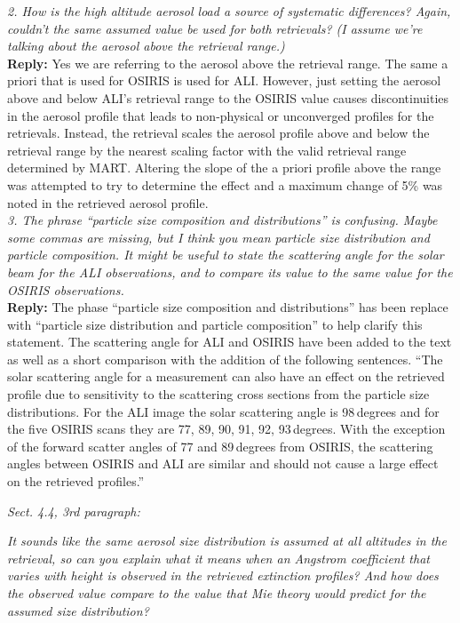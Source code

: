 \documentclass[12pt, notitlepage]{article}
\begin{document}
\textit{2. How is the high altitude aerosol load a source of systematic differences? Again,
couldn't the same assumed value be used for both retrievals? (I assume we're talking
about the aerosol above the retrieval range.)}\\

\textbf{Reply:} Yes we are referring to the aerosol above the retrieval range. The same a priori that is used for OSIRIS is used for ALI. However, just setting the aerosol above and below ALI's retrieval range to the OSIRIS value causes discontinuities in the aerosol profile that leads to non-physical or unconverged profiles for the retrievals. Instead, the retrieval scales the aerosol profile above and below the retrieval range by the nearest scaling factor with the valid retrieval range determined by MART. Altering the slope of the a priori profile above the range was attempted to try to determine the effect and a maximum change of 5\% was noted in the retrieved aerosol profile.\\

\textit{3. The phrase ``particle size composition and distributions'' is confusing. Maybe some
commas are missing, but I think you mean particle size distribution and particle composition.
It might be useful to state the scattering angle for the solar beam for the ALI observations,
and to compare its value to the same value for the OSIRIS observations.}\\

\textbf{Reply:} The phase ``particle size composition and distributions'' has been replace with ``particle size distribution and particle composition'' to help clarify this statement. The scattering angle for ALI and OSIRIS have been added to the text as well as a short comparison with the addition of the following sentences. ``The solar scattering angle for a measurement can also have an effect on the retrieved profile due to sensitivity to the scattering cross sections from the particle size distributions. For the ALI image the solar scattering angle is 98\,degrees and for the five OSIRIS scans they are 77, 89, 90, 91, 92, 93\,degrees. With the exception of the forward scatter angles of 77 and 89\,degrees from OSIRIS, the scattering angles between OSIRIS and ALI are similar and should not cause a large effect on the retrieved profiles.''\\

\hrulefill

\textit{Sect. 4.4, 3rd paragraph:}

\textit{It sounds like the same aerosol size distribution is assumed at all altitudes in the retrieval,
so can you explain what it means when an Angstrom coefficient that varies with
height is observed in the retrieved extinction profiles? And how does the observed
value compare to the value that Mie theory would predict for the assumed size distribution?}\\
\end{document}

